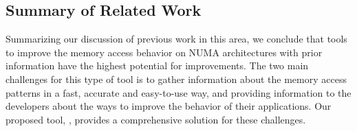 \subsection{Summary of Related Work}

Summarizing our discussion of previous work in this area, we conclude that tools to improve the memory access behavior on NUMA architectures with prior information have the highest potential for improvements.
The two main challenges for this type of tool is to gather information about the memory access patterns in a fast, accurate and easy-to-use way, and providing information to the developers about the ways to improve the behavior of their applications.
Our proposed tool, \TABARNAC, provides a comprehensive solution for these challenges.



